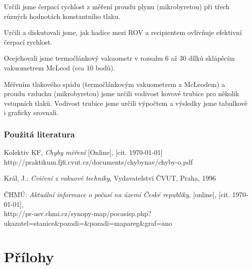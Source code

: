 \documentclass[english]{article}
\begin{document}
	Určili jsme čerpací rychlost z měření proudu plynu (mikrobyretou) při třech různých hodnotách konstantního tlaku.
	
	Určili a diskutovali jsme, jak hadice mezi ROV a recipientem ovlivňuje efektivní čerpací rychlost.
	
	Ocejchovali jsme termočlánkový vakuometr v rozsahu 6 až 30 dílků sklápěcím vakuometrem McLeod (cca 10 bodů).
	
	Měřením tlakového spádu (termočlánkovým vakuometrem a McLeodem) a proudu vzduchu (mikrobyretou) jsme určili vodivost kovové trubice pro několik vstupních tlaků. Vodivost trubice jsme určili výpočtem a výsledky jsme tabulkově i graficky srovnali.
	
	
\section {Použitá literatura}
\begingroup
\renewcommand{\section}[2]{}

\begin{thebibliography}{9}

 Kolektiv KF, \emph{Chyby měření} [Online], [cit. \today] \newline http://praktikum.fjfi.cvut.cz/documents/chybynav/chyby-o.pdf

Král, J.: \emph{Cvičení z vakuové techniky},
Vydavatelství ČVUT, Praha, 1996

ČHMÚ: \emph{Aktuální informace o počasí na území
České republiky}, {[}online{]}, {[}cit. \today{]},\\
 http://pr-asv.chmi.cz/synopy-map/pocasisp.php?ukazatel=stanice\&pozadi=\&pozadi=mapareg\&graf=ano
 

\end{thebibliography}
\endgroup
\setcounter{equation}{0}

\clearpage
\part*{Přílohy}

\end{document}

